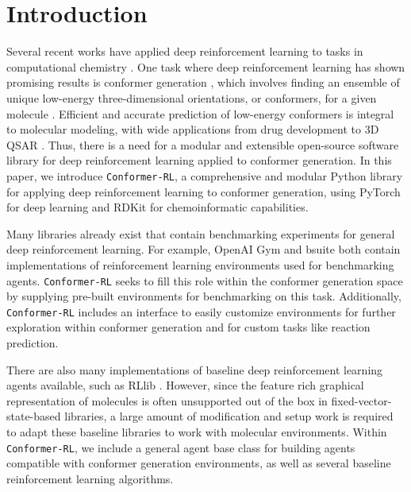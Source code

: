 \documentclass[twoside,11pt]{article}
\newcommand{\code}[1]{\texttt{#1}}
\newcommand{\titleofpaper}{Conformer-RL}
\newcommand{\genComment}[2]{\ifnum\comments=1{\color{#1}{\textsf{\footnotesize #2}}}\fi}
\newcommand{\ambuj}[1] {\genComment{red}{[AT: #1]}}
\newcommand{\tarun}[1] {\genComment{blue}{[TG: #1]}}
\newcommand{\runxuan}[1]{\genComment{pink}{[RJ:#1]}}
\begin{document}

\section{Introduction}
Several recent works have applied deep reinforcement learning to tasks in computational chemistry \citep{li2018foldingzero,zhou2017reactions,simm2020moldesign}. One task where deep reinforcement learning has shown promising results is conformer generation \citep{gogineni2020torsionnet}, which involves finding an ensemble of unique low-energy three-dimensional orientations, or conformers, for a given molecule \citep{ebejer2020confgen}. Efficient and accurate prediction of low-energy conformers is integral to molecular modeling, with wide applications from drug development to 3D QSAR \citep{cole2018confgen}. Thus, there is a need for a modular and extensible open-source software library for deep reinforcement learning applied to conformer generation.
In this paper, we introduce \code{\titleofpaper}, a comprehensive and modular Python library for applying deep reinforcement learning to conformer generation, using PyTorch \citep{torch} for deep learning and RDKit \citep{Landrum2016rdkit} for chemoinformatic capabilities.

Many libraries already exist that contain benchmarking experiments for general deep reinforcement learning. For example, OpenAI Gym \citep{brockman2016gym} and bsuite \citep{osband2020bsuite} both contain implementations of reinforcement learning environments used for benchmarking agents. \code{\titleofpaper} seeks to fill this role within the conformer generation space by supplying pre-built environments for benchmarking on this task. Additionally, \code{\titleofpaper} includes an interface to easily customize environments for further exploration within conformer generation and for custom tasks like reaction prediction.

There are also many implementations of baseline deep reinforcement learning agents available, such as RLlib \citep{liang2018rllib}. However, since the feature rich graphical representation of molecules is often unsupported out of the box in fixed-vector-state-based libraries, a large amount of modification and setup work is required to adapt these baseline libraries to work with molecular environments. Within \code{\titleofpaper}, we include a general agent base class for building agents compatible with conformer generation environments, as well as several baseline reinforcement learning algorithms.
\end{document}
